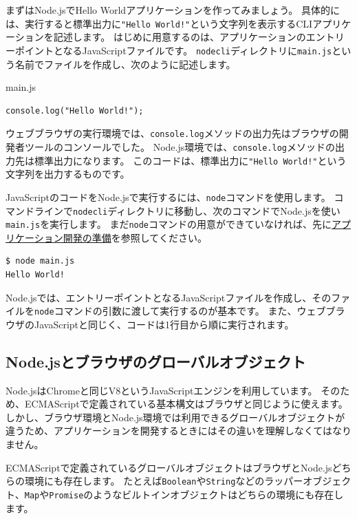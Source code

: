 まずはNode.jsでHello Worldアプリケーションを作ってみましょう。
具体的には、実行すると標準出力に\texttt{"Hello World!"}という文字列を表示するCLIアプリケーションを記述します。
はじめに用意するのは、アプリケーションのエントリーポイントとなるJavaScriptファイルです。
\texttt{nodecli}ディレクトリに\texttt{main.js}という名前でファイルを作成し、次のように記述します。

\begin{listtitle}
main.js
\end{listtitle}
\begin{lstlisting}
console.log("Hello World!");
\end{lstlisting}
\listend

ウェブブラウザの実行環境では、\texttt{console.log}メソッドの出力先はブラウザの開発者ツールのコンソールでした。
Node.js環境では、\texttt{console.log}メソッドの出力先は標準出力になります。
このコードは、標準出力に\texttt{"Hello World!"}という文字列を出力するものです。

JavaScriptのコードをNode.jsで実行するには、\texttt{node}コマンドを使用します。
コマンドラインで\texttt{nodecli}ディレクトリに移動し、次のコマンドでNode.jsを使い\texttt{main.js}を実行します。
まだ\texttt{node}コマンドの用意ができていなければ、先に\href{../../setup-local-env/README.md}{アプリケーション開発の準備}を参照してください。

\begin{lstlisting}
$ node main.js
Hello World!
\end{lstlisting}

Node.jsでは、エントリーポイントとなるJavaScriptファイルを作成し、そのファイルを\texttt{node}コマンドの引数に渡して実行するのが基本です。
また、ウェブブラウザのJavaScriptと同じく、コードは1行目から順に実行されます。

\hypertarget{global-objects}{%
\subsection{Node.jsとブラウザのグローバルオブジェクト}\label{global-objects}}

Node.jsはChromeと同じV8というJavaScriptエンジンを利用しています。
そのため、ECMAScriptで定義されている基本構文はブラウザと同じように使えます。
しかし、ブラウザ環境とNode.js環境では利用できるグローバルオブジェクトが違うため、アプリケーションを開発するときにはその違いを理解しなくてはなりません。

ECMAScriptで定義されているグローバルオブジェクトはブラウザとNode.jsどちらの環境にも存在します。
たとえば\texttt{Boolean}や\texttt{String}などのラッパーオブジェクト、\texttt{Map}や\texttt{Promise}のようなビルトインオブジェクトはどちらの環境にも存在します。

